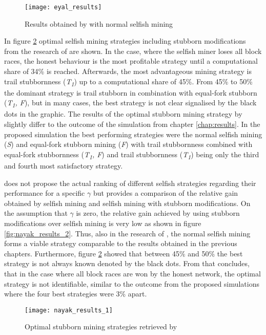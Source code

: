 \begin{figure}[t]
\texttt{[image: eyal\_results]}
\centering
\caption{Results obtained by \cite{eyal2014majority} with normal selfish mining}
\label{fig:eyal_results}
\end{figure}

In figure \ref{fig:nayak_results_1} optimal selfish mining strategies including stubborn modifications from the research of \cite{nayak2016stubborn} are shown.
In the case, where the selfish miner loses all block races, the honest behaviour is the most profitable strategy until a computational share of 34\% is reached.
Afterwards, the most advantageous mining strategy is trail stubbornness (\textit{T\textsubscript{1}}) up to a computational share of 45\%.
From 45\% to 50\% the dominant strategy is trail stubborn in combination with equal-fork stubborn (\textit{T\textsubscript{1}, F}), but in many cases, the best strategy is not clear signalised by the black dots in the graphic.
The results of the optimal stubborn mining strategy by \cite{nayak2016stubborn} slightly differ to the outcome of the simulation from chapter \ref{chap:results}.
In the proposed simulation the best performing strategies were the normal selfish mining (\textit{S}) and equal-fork stubborn mining (\textit{F}) with trail stubbornness combined with equal-fork stubbornness (\textit{T\textsubscript{1}, F}) and trail stubbornness (\textit{T\textsubscript{1}}) being only the third and fourth most satisfactory strategy.

\cite{nayak2016stubborn} does not propose the actual ranking of different selfish strategies regarding their performance for a specific $\gamma$ but provides a comparison of the relative gain obtained by selfish mining and selfish mining with stubborn modifications.
On the assumption that $\gamma$ is zero, the relative gain achieved by using stubborn modifications over selfish mining is very low as shown in figure \ref{fig:nayak_results_2}.
Thus, also in the research of \cite{nayak2016stubborn}, the normal selfish mining forms a viable strategy comparable to the results obtained in the previous chapters.
Furthermore, figure \ref{fig:nayak_results_1} showed that between 45\% and 50\% the best strategy is not always known denoted by the black dots.
From that concludes, that in the case where all block races are won by the honest network, the optimal strategy is not identifiable, similar to the outcome from the proposed simulations where the four best strategies were 3\% apart.

\begin{figure}[t]
\texttt{[image: nayak\_results\_1]}
\centering
\caption{Optimal stubborn mining strategies retrieved by \cite{nayak2016stubborn}}
\label{fig:nayak_results_1}
\end{figure}

